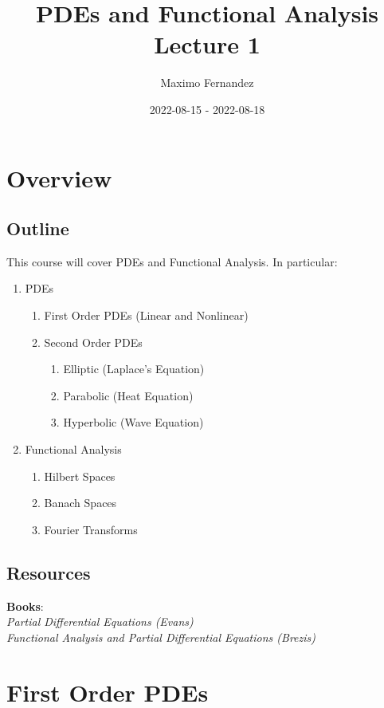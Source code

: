 \documentclass[12pt]{article}
\author{Maximo Fernandez}
\title{PDEs and Functional Analysis\\ Lecture 1}
\date{
    2022-08-15 - 2022-08-18
}
\begin{document}
\maketitle
\section{Overview}
\label{sec:overview}
\subsection{Outline}
\label{sub:outline}
This course will cover PDEs and Functional Analysis. In particular:
\begin{enumerate}
    \item PDEs
    \begin{enumerate}
        \item First Order PDEs (Linear and Nonlinear)
        \item Second Order PDEs
        \begin{enumerate}
            \item Elliptic (Laplace's Equation)
            \item Parabolic (Heat Equation)
            \item Hyperbolic (Wave Equation)
        \end{enumerate}
    \end{enumerate}
    \item Functional Analysis
        \begin{enumerate}
            \item Hilbert Spaces
            \item Banach Spaces
            \item Fourier Transforms
        \end{enumerate}
\end{enumerate}
\subsection{Resources}
\label{sub:resources}
\textbf{Books}:
\\
\emph{Partial Differential Equations (Evans)}
\\
\emph{Functional Analysis and Partial Differential Equations (Brezis)}

\pagebreak
\section{First Order PDEs}
\label{sec:first_order_pdes}
\end{document}
